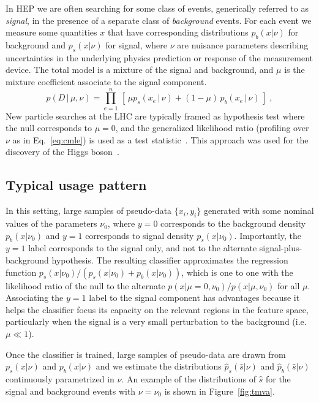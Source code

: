 \documentclass[12pt]{article}
\numberwithin{equation}{section}
\theoremstyle{plain}
\begin{document}
In HEP we are often searching for some
class of events, generically referred to as \textit{signal}, in the presence of a separate class
of \textit{background} events.  For each event we measure some quantities $x$ that have corresponding distributions
$p_b(x|\nu)$ for background and $p_s(x|\nu)$ for signal, where $\nu$ are nuisance parameters describing
uncertainties in the underlying physics prediction or response of the measurement device. The
total model is a mixture of the signal and background, and $\mu$ is the mixture coefficient associate
to the signal component.
\begin{equation}\label{eq:hepGen}
p( D \,|\, \mu, \nu) = \prod_{e=1}^n \, \left[\, \mu p_s( x_e \, |\,  \nu)  + (1-\mu)\, p_b( x_e \,|\, \nu) \,\right] \; ,
\end{equation}
New particle searches at the LHC are typically framed as hypothesis test where the null corresponds to $\mu=0$, and the
generalized likelihood ratio (profiling over $\nu$ as in Eq.~\ref{eq:cmle}) is used as a test statistic~\citep{Cowan:2010js}. This approach was used for the discovery of the Higgs boson~\citep{Aad:2012tfa,Chatrchyan:2012ufa}.


\subsection{Typical usage pattern}

In this setting, large samples of pseudo-data $\{x_i, y_i\}$ generated with some nominal values of the parameters $\nu_0$, where $y=0$ corresponds to the background density $p_b(x|\nu_0)$  and $y=1$ corresponds to signal density $p_s(x|\nu_0)$. Importantly, the $y=1$ label corresponds to the signal only, and not to the alternate signal-plus-background hypothesis. The resulting classifier approximates the regression function $p_s(x|\nu_0)/(p_s(x|\nu_0)+p_b(x|\nu_0))$, which is one to one with the likelihood ratio of the null to the alternate $p(x|\mu=0,\nu_0)/p(x|\mu,\nu_0)$ for all $\mu$. Associating the $y=1$ label to the signal component has advantages because it helps the classifier focus its capacity on the relevant regions in the feature space, particularly when the signal is a very small perturbation to the background (i.e. $\mu \ll 1$).

 Once the classifier is trained, large samples of pseudo-data are drawn from $p_s(x | \nu)$ and $p_b(x | \nu)$ and we estimate the distributions  $\hat{p}_s(\hat s | \nu)$ and $\hat{p}_b(\hat s | \nu)$ continuously parametrized in $\nu$.
An example of the distributions of $\hat s$ for the signal and background events with $\nu=\nu_0$ is shown in Figure~\ref{fig:tmva}.
\end{document}
